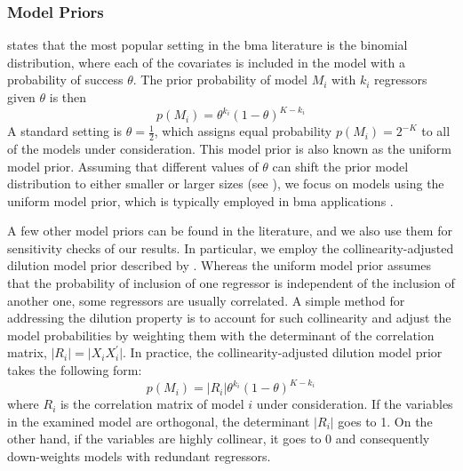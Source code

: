 \documentclass[a4paper,11pt]{article}
\begin{document}
\subsubsection*{Model Priors}
\citet{MoralBenito2012} states that the most popular setting in the \ac{bma} literature is the binomial distribution, where each of the covariates is included in the model with a probability of success $\theta$. The prior probability of model $M_{i}$ with $k_{i}$ regressors given $\theta$ is then
\begin{equation}
p(M_{i})=\theta^{k_{i}}(1-\theta)^{K-k_{i}}
\end{equation}
A standard setting is $\theta=\frac{1}{2}$, which assigns equal probability $p(M_{i}) = 2^{-K}$ to all of the models under consideration. This model prior is also known as the uniform model prior. Assuming that different values of $\theta$ can shift the prior model distribution to either smaller or larger sizes (see \citet{Zeugner2011}), we focus on models using the uniform model prior, which is typically employed in \ac{bma} applications \citet{Fernandezetal2001}.

A few other model priors can be found in the literature, and we also use them for sensitivity checks of our results. In particular, we employ the collinearity-adjusted dilution model prior described by \citet{george2010}. Whereas the uniform model prior assumes that the probability of inclusion of one regressor is independent of the inclusion of another one, some regressors are usually correlated. A simple method for addressing the dilution property is to account for such collinearity and adjust the model probabilities by weighting them with the determinant of the correlation matrix, $\vert R_{i} \vert = \vert X_{i}^{}X_{i}^{\prime} \vert$. In practice, the collinearity-adjusted dilution model prior takes the following form:
%
\begin{equation}
p(M_{i})=\vert R_{i} \vert \theta^{k_{i}}(1-\theta)^{K-k_{i}}
\end{equation}
%
where $R_{i}$ is the correlation matrix of model $i$ under consideration. If the variables in the examined model are orthogonal, the determinant $\vert R_{i} \vert$ goes to 1. On the other hand, if the variables are highly collinear, it goes to 0 and consequently down-weights models with redundant regressors.
\end{document}
